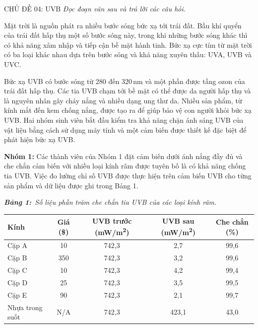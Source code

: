 \documentclass[12pt,a4paper,twoside]{article}
\newcommand{\tablecaption}[2]{%
    \par\vspace{2pt}%
    {\centering\textbf{\textit{Bảng #1:}}~\textit{#2}\par}%
    \vspace{0pt}%
}
\newenvironment{readingpassage}[1][]{%
    \begin{tcolorbox}[enhanced, colback=grayLight, colframe=secondaryBlue,
        coltitle=textDark, fonttitle=\bfseries, title={#1},
        rounded corners, arc=3mm, boxrule=1pt,
        left=15pt, right=15pt, top=10pt, bottom=10pt,
        breakable, before skip=10pt, after skip=10pt, drop fuzzy shadow]
    \setstretch{1.3}
}{\end{tcolorbox}}
\begin{document}
\label{b1_cd04}
\begin{topicbox}{\large CHỦ ĐỀ 04: UVB}
\vspace{8pt}
\textit{Đọc đoạn văn sau và trả lời các câu hỏi.}
\vspace{6pt}
\end{topicbox}
\vspace{5pt}
\begin{readingpassage}[]
Mặt trời là nguồn phát ra nhiều bước sóng bức xạ tới trái đất. Bầu khí quyển của trái đất hấp thụ một số bước sóng này, trong khi những bước sóng khác thì có khả năng xâm nhập và tiếp cận bề mặt hành tinh. Bức xạ cực tím từ mặt trời có ba loại khác nhau dựa trên bước sóng và khả năng xuyên thấu: UVA, UVB và UVC.

Bức xạ UVB có bước sóng từ 280 đến 320\,nm và một phần được tầng ozon của trái đất hấp thụ. Các tia UVB chạm tới bề mặt có thể được da người hấp thụ và là nguyên nhân gây cháy nắng và nhiều dạng ung thư da. Nhiều sản phẩm, từ kính mắt đến kem chống nắng, được tạo ra để giúp bảo vệ con người khỏi bức xạ UVB. Hai nhóm sinh viên bắt đầu kiểm tra khả năng chặn ánh sáng UVB của vật liệu bằng cách sử dụng máy tính và một cảm biến được thiết kế đặc biệt để phát hiện bức xạ UVB.

\textbf{Nhóm 1:} Các thành viên của Nhóm 1 đặt cảm biến dưới ánh nắng đầy đủ và che chắn cảm biến với nhiều loại kính râm được tuyên bố là có khả năng chống tia UVB. Việc đo lường chỉ số UVB được thực hiện trên cảm biến UVB cho từng sản phẩm và dữ liệu được ghi trong Bảng 1.

\tablecaption{1}{Số liệu phần trăm che chắn tia UVB của các loại kính râm.}
\renewcommand{\arraystretch}{1.3}
{\footnotesize
{}%
\begin{center}
\begin{tabular}{|l|c|c|c|c|}
\hline
\rowcolor{primaryBlue!12}
\textbf{Kính} & \textbf{Giá (\$)} & \textbf{UVB trước (mW/m\textsuperscript{2})} & \textbf{UVB sau (mW/m\textsuperscript{2})} & \textbf{Che chắn (\%)} \\
\hline
Cặp A & 10 & 742,3 & 2,7 & 99,6 \\
\hline
Cặp B & 350 & 742,3 & 3,2 & 99,6 \\
\hline
Cặp C & 10 & 742,3 & 4,2 & 99,4 \\
\hline
Cặp D & 25 & 742,3 & 3,5 & 99,5 \\
\hline
Cặp E & 90 & 742,3 & 2,1 & 99,7 \\
\hline
Nhựa trong suốt & N/A & 742,3 & 423,1 & 43,0 \\
\hline
\end{tabular}
\end{center}
}


\end{readingpassage}
\end{document}
